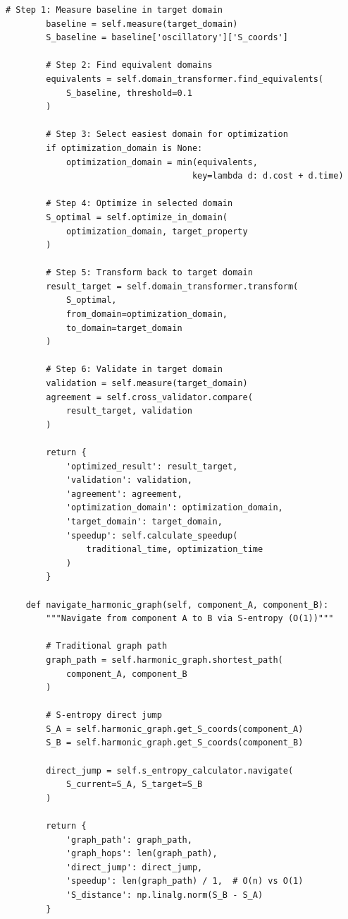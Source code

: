\documentclass[12pt,a4paper]{article}
\begin{document}
{{{{{{{{{{{{{{{{\begin{lstlisting}[style=pythonstyle, caption=Grand Unified Laboratory Compiler Core]
        # Step 1: Measure baseline in target domain
        baseline = self.measure(target_domain)
        S_baseline = baseline['oscillatory']['S_coords']
        
        # Step 2: Find equivalent domains
        equivalents = self.domain_transformer.find_equivalents(
            S_baseline, threshold=0.1
        )
        
        # Step 3: Select easiest domain for optimization
        if optimization_domain is None:
            optimization_domain = min(equivalents, 
                                     key=lambda d: d.cost + d.time)
        
        # Step 4: Optimize in selected domain
        S_optimal = self.optimize_in_domain(
            optimization_domain, target_property
        )
        
        # Step 5: Transform back to target domain
        result_target = self.domain_transformer.transform(
            S_optimal, 
            from_domain=optimization_domain,
            to_domain=target_domain
        )
        
        # Step 6: Validate in target domain
        validation = self.measure(target_domain)
        agreement = self.cross_validator.compare(
            result_target, validation
        )
        
        return {
            'optimized_result': result_target,
            'validation': validation,
            'agreement': agreement,
            'optimization_domain': optimization_domain,
            'target_domain': target_domain,
            'speedup': self.calculate_speedup(
                traditional_time, optimization_time
            )
        }
    
    def navigate_harmonic_graph(self, component_A, component_B):
        """Navigate from component A to B via S-entropy (O(1))"""
        
        # Traditional graph path
        graph_path = self.harmonic_graph.shortest_path(
            component_A, component_B
        )
        
        # S-entropy direct jump
        S_A = self.harmonic_graph.get_S_coords(component_A)
        S_B = self.harmonic_graph.get_S_coords(component_B)
        
        direct_jump = self.s_entropy_calculator.navigate(
            S_current=S_A, S_target=S_B
        )
        
        return {
            'graph_path': graph_path,
            'graph_hops': len(graph_path),
            'direct_jump': direct_jump,
            'speedup': len(graph_path) / 1,  # O(n) vs O(1)
            'S_distance': np.linalg.norm(S_B - S_A)
        }
\end{lstlisting}

}}}}}}}}}}}}}}}}
\end{document}
